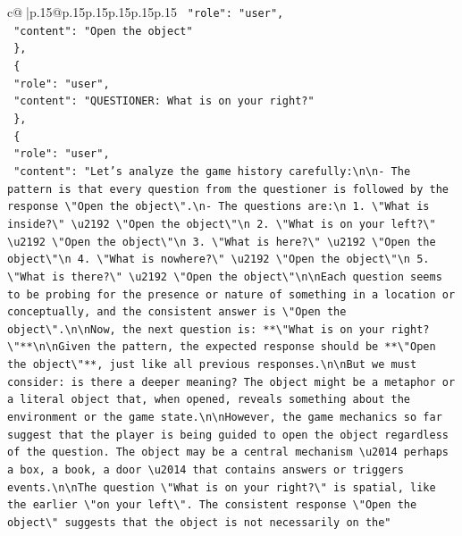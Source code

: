 \documentclass{article}
\begin{document}
{\begin{supertabular}{c@{$\;$}|p{.15\linewidth}@{}p{.15\linewidth}p{.15\linewidth}p{.15\linewidth}p{.15\linewidth}p{.15\linewidth}}
{{{\texttt{    "role": "user",} \\
\texttt{    "content": "Open the object"} \\
\texttt{  \},} \\
\texttt{  \{} \\
\texttt{    "role": "user",} \\
\texttt{    "content": "QUESTIONER: What is on your right?"} \\
\texttt{  \},} \\
\texttt{  \{} \\
\texttt{    "role": "user",} \\
\texttt{    "content": "Let's analyze the game history carefully:\textbackslash{}n\textbackslash{}n{-} The pattern is that every question from the questioner is followed by the response \textbackslash{}"Open the object\textbackslash{}".\textbackslash{}n{-} The questions are:\textbackslash{}n  1. \textbackslash{}"What is inside?\textbackslash{}" \textbackslash{}u2192 \textbackslash{}"Open the object\textbackslash{}"\textbackslash{}n  2. \textbackslash{}"What is on your left?\textbackslash{}" \textbackslash{}u2192 \textbackslash{}"Open the object\textbackslash{}"\textbackslash{}n  3. \textbackslash{}"What is here?\textbackslash{}" \textbackslash{}u2192 \textbackslash{}"Open the object\textbackslash{}"\textbackslash{}n  4. \textbackslash{}"What is nowhere?\textbackslash{}" \textbackslash{}u2192 \textbackslash{}"Open the object\textbackslash{}"\textbackslash{}n  5. \textbackslash{}"What is there?\textbackslash{}" \textbackslash{}u2192 \textbackslash{}"Open the object\textbackslash{}"\textbackslash{}n\textbackslash{}nEach question seems to be probing for the presence or nature of something in a location or conceptually, and the consistent answer is \textbackslash{}"Open the object\textbackslash{}".\textbackslash{}n\textbackslash{}nNow, the next question is: **\textbackslash{}"What is on your right?\textbackslash{}"**\textbackslash{}n\textbackslash{}nGiven the pattern, the expected response should be **\textbackslash{}"Open the object\textbackslash{}"**, just like all previous responses.\textbackslash{}n\textbackslash{}nBut we must consider: is there a deeper meaning? The object might be a metaphor or a literal object that, when opened, reveals something about the environment or the game state.\textbackslash{}n\textbackslash{}nHowever, the game mechanics so far suggest that the player is being guided to open the object regardless of the question. The object may be a central mechanism \textbackslash{}u2014 perhaps a box, a book, a door \textbackslash{}u2014 that contains answers or triggers events.\textbackslash{}n\textbackslash{}nThe question \textbackslash{}"What is on your right?\textbackslash{}" is spatial, like the earlier \textbackslash{}"on your left\textbackslash{}". The consistent response \textbackslash{}"Open the object\textbackslash{}" suggests that the object is not necessarily on the"} \\
}}}
\end{supertabular}}
\end{document}
